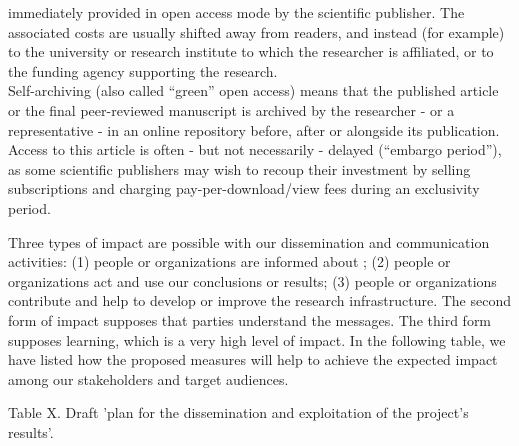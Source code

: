 {immediately provided in open access mode by the scientific publisher. The associated costs
are usually shifted away from readers, and instead (for example) to the university or
research institute to which the researcher is affiliated, or to the funding agency supporting
the research.\\
Self-archiving (also called ``green'' open access) means that the published article or the
final peer-reviewed manuscript is archived by the researcher - or a representative - in an
online repository before, after or alongside its publication. Access to this article is often -
but not necessarily - delayed (``embargo period''), as some scientific publishers may wish to
recoup their investment by selling subscriptions and charging pay-per-download/view fees
during an exclusivity period.}

Three types of impact are possible with our dissemination and
communication activities: (1) people or organizations are informed
about \TheProject; (2) people or organizations act and use our conclusions
or results; (3) people or organizations contribute and help to develop
or improve the research infrastructure. The second form of impact
supposes that parties understand the messages. The third form supposes
learning, which is a very high level of impact. In the following table,
we have listed how the proposed measures will help to achieve the
expected impact among our stakeholders and target audiences.

Table X.  Draft 'plan for the dissemination and exploitation of the
project's results'.

